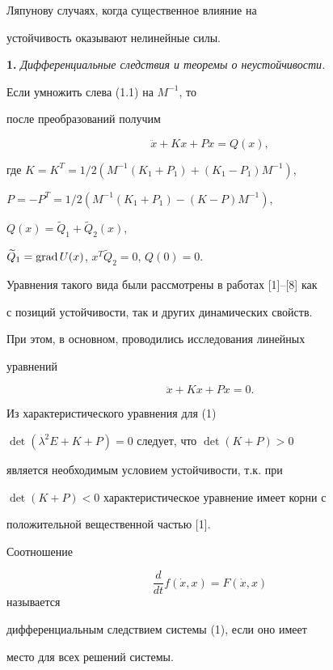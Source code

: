 Ляпунову случаях, когда существенное влияние на


устойчивость оказывают нелинейные силы.


\medskip





{\bf 1.} {\it Дифференциальные следствия и теоремы о неустойчивости.}


Если умножить слева (1.1) на $M^{-1}$, то


после преобразований получим


\begin{equation}


\ddot x + Kx+Px=Q(x), \tag{1}


\end{equation}


где $K=K^{T}=1/2(M^{-1}(K_{1}+P_{1})+(K_{1}-P_{1})M^{-1})$,


$P=-P^{T}=1/2(M^{-1}(K_{1}+P_{1})-(K-P)M^{-1})$,


$Q(x)=\widetilde{Q}_{1}+\widetilde{Q}_{2}(x)$,


$\widetilde{Q}_{1}=\operatorname{grad} U(x)$, $x^{T}\widetilde{Q}_{2}=0$, $Q(0)=0.$


Уравнения такого вида были рассмотрены в работах [1]--[8] как


с позиций устойчивости, так и других динамических свойств.


При этом, в основном, проводились исследования линейных


уравнений


\begin{equation}


\ddot x + Kx+Px=0. \tag{1$'$}


\end{equation}


Из характеристического уравнения для (1)


$\det(\lambda ^{2}E+K+P)=0$ следует, что $\det(K+P)>0$


является необходимым условием устойчивости, т.к. при


$\det(K+P)<0$ характеристическое уравнение имеет корни с


положительной вещественной частью [1].





\begin{defnnonum} Соотношение


$$


\frac{d}{dt}f(\Dot x ,x)=F(\Dot x ,x)


$$ называется


дифференциальным следствием системы (1), если оно имеет


место для всех решений системы.


\end{defnnonum}





